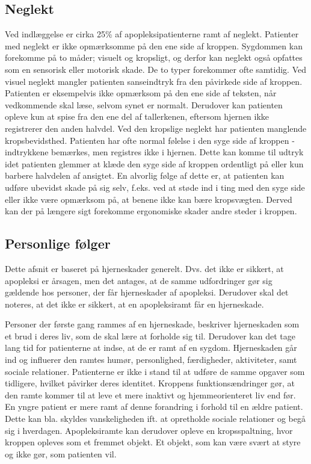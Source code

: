 \subsection{Neglekt}
Ved indlæggelse er cirka 25\% af apopleksipatienterne ramt af neglekt\cite{Sundhedsstyrelsen2009}. Patienter med neglekt er ikke opmærksomme på den ene side af kroppen. Sygdommen kan forekomme på to måder; visuelt og kropsligt, og derfor kan neglekt også opfattes som en sensorisk eller motorisk skade. De to typer forekommer ofte samtidig. Ved visuel neglekt mangler patienten sanseindtryk fra den påvirkede side af kroppen. Patienten er eksempelvis ikke opmærksom på den ene side af teksten, når vedkommende skal læse, selvom synet er normalt. Derudover kan patienten opleve kun at spise fra den ene del af tallerkenen, eftersom hjernen ikke registrerer den anden halvdel. Ved den kropslige neglekt har patienten manglende kropsbevidsthed. Patienten har ofte normal følelse i den syge side af kroppen - indtrykkene bemærkes, men registres ikke i hjernen. Dette kan komme til udtryk idet patienten glemmer at klæde den syge side af kroppen ordentligt på eller kun barbere halvdelen af ansigtet. En alvorlig følge af dette er, at patienten kan udføre ubevidst skade på sig selv, f.eks. ved at støde ind i ting med den syge side eller ikke være opmærksom på, at benene ikke kan bære kropsvægten. Derved kan der på længere sigt forekomme ergonomiske skader andre steder i kroppen. \cite{Sundhed.dk}

\subsection{Personlige følger}
Dette afsnit er baseret på hjerneskader generelt. Dvs. det ikke er sikkert, at apopleksi er årsagen, men det antages, at de samme udfordringer gør sig gældende hos personer, der får hjerneskader af apopleksi. Derudover skal det noteres, at det ikke er sikkert, at en apopleksiramt får en hjerneskade.

Personer der første gang rammes af en hjerneskade, beskriver hjerneskaden som et brud i deres liv, som de skal lære at forholde sig til. Derudover kan det tage lang tid for patienterne at indse, at de er ramt af en sygdom. Hjerneskaden går ind og influerer den ramtes humør, personlighed, færdigheder, aktiviteter, samt sociale relationer. Patienterne er ikke i stand til at udføre de samme opgaver som tidligere, hvilket påvirker deres identitet. Kroppens funktionsændringer gør, at den ramte kommer til at leve et mere inaktivt og hjemmeorienteret liv end før. En yngre patient er mere ramt af denne forandring i forhold til en ældre patient. Dette kan bla. skyldes vanskeligheden ift. at opretholde sociale relationer og begå sig i hverdagen. Apopleksiramte kan derudover opleve en kropsspaltning, hvor kroppen opleves som et fremmet objekt. Et objekt, som kan være svært at styre og ikke gør, som patienten vil.\cite{Sundhedsstyrelsen2010}

